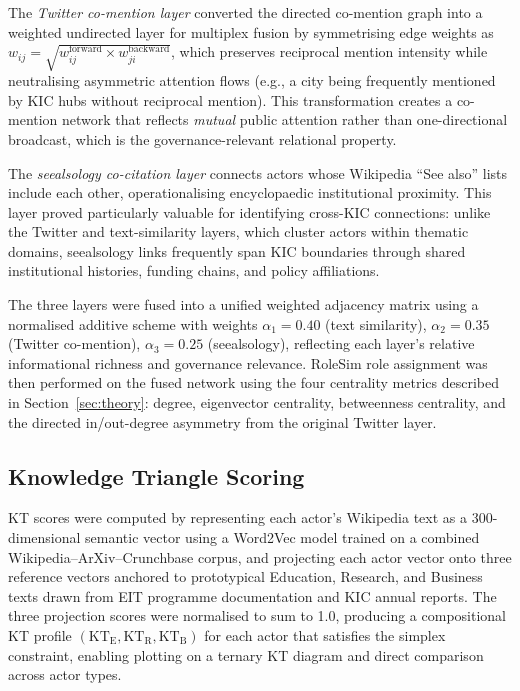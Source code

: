 \documentclass[review,12pt]{elsarticle}
\begin{document}
The \emph{Twitter co-mention layer} converted the directed co-mention graph into a weighted undirected layer for multiplex fusion by symmetrising edge weights as $w_{ij} = \sqrt{w_{ij}^{\text{forward}} \times w_{ji}^{\text{backward}}}$, which preserves reciprocal mention intensity while neutralising asymmetric attention flows (e.g., a city being frequently mentioned by KIC hubs without reciprocal mention). This transformation creates a co-mention network that reflects \emph{mutual} public attention rather than one-directional broadcast, which is the governance-relevant relational property.

The \emph{seealsology co-citation layer} connects actors whose Wikipedia ``See also'' lists include each other, operationalising encyclopaedic institutional proximity. This layer proved particularly valuable for identifying cross-KIC connections: unlike the Twitter and text-similarity layers, which cluster actors within thematic domains, seealsology links frequently span KIC boundaries through shared institutional histories, funding chains, and policy affiliations.

The three layers were fused into a unified weighted adjacency matrix using a normalised additive scheme with weights $\alpha_1 = 0.40$ (text similarity), $\alpha_2 = 0.35$ (Twitter co-mention), $\alpha_3 = 0.25$ (seealsology), reflecting each layer's relative informational richness and governance relevance. RoleSim role assignment was then performed on the fused network using the four centrality metrics described in Section~\ref{sec:theory}: degree, eigenvector centrality, betweenness centrality, and the directed in/out-degree asymmetry from the original Twitter layer.

\subsection{Knowledge Triangle Scoring}

KT scores were computed by representing each actor's Wikipedia text as a 300-dimensional semantic vector using a Word2Vec model trained on a combined Wikipedia--ArXiv--Crunchbase corpus, and projecting each actor vector onto three reference vectors anchored to prototypical Education, Research, and Business texts drawn from EIT programme documentation and KIC annual reports. The three projection scores were normalised to sum to 1.0, producing a compositional KT profile $(\text{KT}_\text{E}, \text{KT}_\text{R}, \text{KT}_\text{B})$ for each actor that satisfies the simplex constraint, enabling plotting on a ternary KT diagram and direct comparison across actor types.
\end{document}
